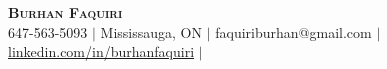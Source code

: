 \begin{center}
    \textbf{\Huge \scshape Burhan Faquiri} \\ \vspace{1pt}
    \small 647-563-5093 $|$ Mississauga, ON $|$ {faquiriburhan@gmail.com} $|$ 
    \href{https://www.linkedin.com/in/burhanfaquiri}{\underline{linkedin.com/in/burhanfaquiri}} $|$ 
\end{center}
